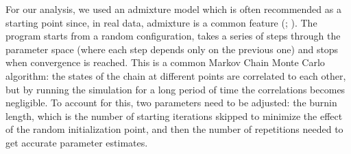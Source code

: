 \documentclass[a4paper, 12pt]{report}
\begin{document}
For our analysis, we used an admixture model which is often recommended as a starting point since, in real data, admixture is a common feature (\cite{pritchardDocumentationStructureSoftware2010}; \cite{suppleConservationBiodiversityGenomics2018}). The program starts from a random configuration, takes a series of steps through the parameter space (where each step depends only on the previous one) and stops when convergence is reached. This is a common Markov Chain Monte Carlo algorithm: the states of the chain at different points are correlated to each other, but by running the simulation for a long period of time the correlations becomes negligible. To account for this, two parameters need to be adjusted: the burnin length, which is the number of starting iterations skipped to minimize the effect of the random initialization point, and then the number of repetitions needed to get accurate parameter estimates. 
\end{document}

